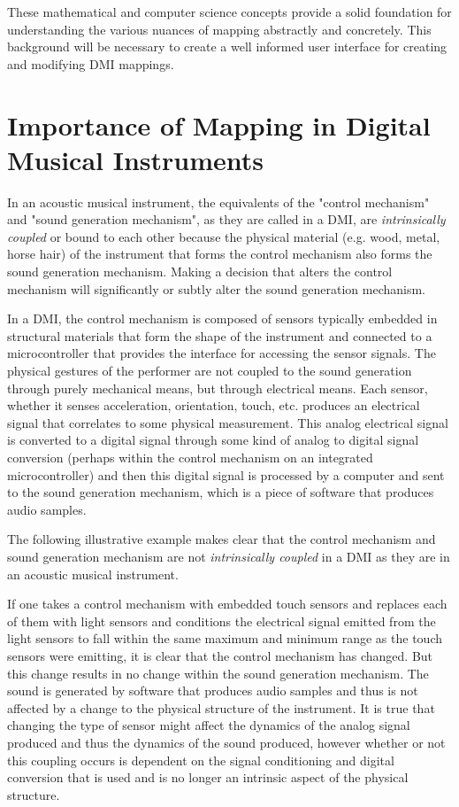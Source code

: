 These mathematical and computer science concepts provide a solid foundation for understanding the various nuances of mapping abstractly and concretely. This background will be necessary to create a well informed user interface for creating and modifying DMI mappings.

\section{Importance of Mapping in Digital Musical Instruments}
\label{sec:Importance of Mapping}

In an acoustic musical instrument, the equivalents of the "control mechanism" and "sound generation mechanism", as they are called in a DMI, are \emph{intrinsically coupled} or bound to each other because the physical material (e.g. wood, metal, horse hair) of the instrument that forms the control mechanism also forms the sound generation mechanism. Making a decision that alters the control mechanism will significantly or subtly alter the sound generation mechanism.

In a DMI, the control mechanism is composed of sensors typically embedded in structural materials that form the shape of the instrument and connected to a microcontroller that provides the interface for accessing the sensor signals. The physical gestures of the performer are not coupled to the sound generation through purely mechanical means, but through electrical means. Each sensor, whether it senses acceleration, orientation, touch, etc. produces an electrical signal that correlates to some physical measurement. This analog electrical signal is converted to a digital signal through some kind of analog to digital signal conversion (perhaps within the control mechanism on an integrated microcontroller) and then this digital signal is processed by a computer and sent to the sound generation mechanism, which is a piece of software that produces audio samples.

The following illustrative example makes clear that the control mechanism and sound generation mechanism are not \emph{intrinsically coupled} in a DMI as they are in an acoustic musical instrument.

If one takes a control mechanism with embedded touch sensors and replaces each of them with light sensors and conditions the electrical signal emitted from the light sensors to fall within the same maximum and minimum range as the touch sensors were emitting, it is clear that the control mechanism has changed. But this change results in no change within the sound generation mechanism. The sound is generated by software that produces audio samples and thus is not affected by a change to the physical structure of the instrument. It is true that changing the type of sensor might affect the dynamics of the analog signal produced and thus the dynamics of the sound produced, however whether or not this coupling occurs is dependent on the signal conditioning and digital conversion that is used and is no longer an intrinsic aspect of the physical structure.

